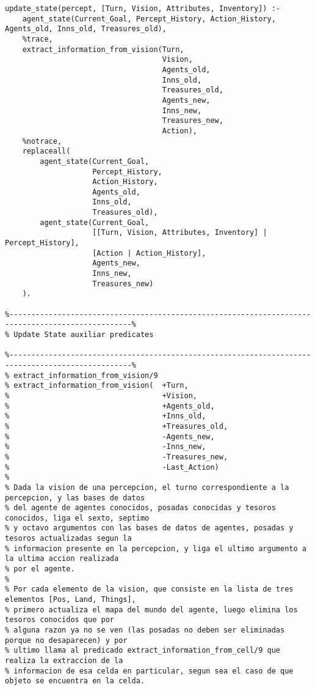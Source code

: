 \documentclass[a4paper,12pt]{report}
\begin{document}
\begin{scriptsize}
\begin{verbatim}
update_state(percept, [Turn, Vision, Attributes, Inventory]) :- 
    agent_state(Current_Goal, Percept_History, Action_History, Agents_old, Inns_old, Treasures_old),
    %trace,
    extract_information_from_vision(Turn, 
                                    Vision, 
                                    Agents_old, 
                                    Inns_old, 
                                    Treasures_old, 
                                    Agents_new, 
                                    Inns_new, 
                                    Treasures_new, 
                                    Action),
    %notrace,
    replaceall(
        agent_state(Current_Goal, 
                    Percept_History,            
                    Action_History,  
                    Agents_old, 
                    Inns_old, 
                    Treasures_old),
        agent_state(Current_Goal, 
                    [[Turn, Vision, Attributes, Inventory] | Percept_History], 
                    [Action | Action_History], 
                    Agents_new, 
                    Inns_new, 
                    Treasures_new)
    ).

%--------------------------------------------------------------------------------------------------%
% Update State auxiliar predicates

%--------------------------------------------------------------------------------------------------%
% extract_information_from_vision/9
% extract_information_from_vision(  +Turn,
%                                   +Vision,
%                                   +Agents_old,
%                                   +Inns_old,
%                                   +Treasures_old,
%                                   -Agents_new,
%                                   -Inns_new,
%                                   -Treasures_new,
%                                   -Last_Action)
% 
% Dada la vision de una percepcion, el turno correspondiente a la percepcion, y las bases de datos 
% del agente de agentes conocidos, posadas conocidas y tesoros conocidos, liga el sexto, septimo
% y octavo argumentos con las bases de datos de agentes, posadas y tesoros actualizadas segun la 
% informacion presente en la percepcion, y liga el ultimo argumento a la ultima accion realizada 
% por el agente.
%
% Por cada elemento de la vision, que consiste en la lista de tres elementos [Pos, Land, Things],
% primero actualiza el mapa del mundo del agente, luego elimina los tesoros conocidos que por
% alguna razon ya no se ven (las posadas no deben ser eliminadas porque no desaparecen) y por
% ultimo llama al predicado extract_information_from_cell/9 que realiza la extraccion de la 
% informacion de esa celda en particular, segun sea el caso de que objeto se encuentra en la celda.


\end{verbatim}
\end{scriptsize}
\end{document}
